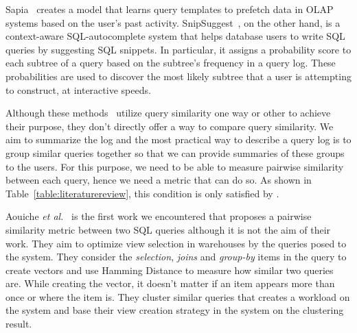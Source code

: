 Sapia~\cite{Sapia:2000:PPQ:646109.679288} creates a model that learns query templates to prefetch data in OLAP systems based on the user's past activity. SnipSuggest~\cite{magda2010snipsuggest}, on the other hand, is a context-aware SQL-autocomplete system that helps database users to write SQL queries by suggesting SQL snippets.
In particular, it assigns a probability score to each subtree of a query based on the subtree's frequency in a query log.
These probabilities are used to discover the most likely subtree that a user is attempting to construct, at interactive speeds.

Although these methods~\cite{agrawal2006context, chatzopoulou2011querie, yang2009, giacometti2009, stefanidis2009you, magda2010snipsuggest} utilize query similarity one way or other to achieve their purpose, they don't directly offer a way to compare query similarity. 
We aim to summarize the log and the most practical way to describe a query log is to group similar queries together so that we can provide summaries of these groups to the users.
For this purpose, we need to be able to measure pairwise similarity between each query, hence we need a metric that can do so. As shown in Table~\ref{table:literaturereview}, this condition is only satisfied by \cite{aouiche2006, aligon2014similarity, makiyama2015text}.

Aouiche \textit{et al.}~\cite{aouiche2006} is the first work we encountered that proposes a pairwise similarity metric between two SQL queries although it is not the aim of their work.
They aim to optimize view selection in warehouses by the queries posed to the system.
They consider the \textit{selection}, \textit{joins} and \textit{group-by} items in the query to create vectors and use Hamming Distance to measure how similar two queries are.
While creating the vector, it doesn't matter if an item appears more than once or where the item is.
They cluster similar queries that creates a workload on the system and base their view creation strategy in the system on the clustering result. 

